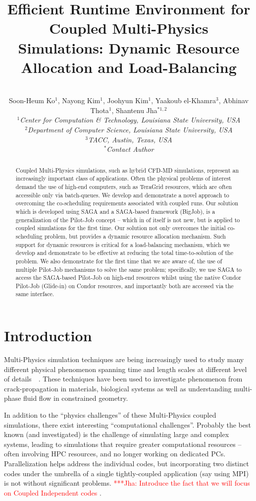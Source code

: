 \documentclass[conference,final]{IEEEtran}
\title{Efficient Runtime Environment for Coupled Multi-Physics Simulations: Dynamic 
Resource Allocation and Load-Balancing}
\author{
~\\[-2em]
Soon-Heum Ko$^{1}$, Nayong Kim$^{1}$, Joohyun Kim$^{1}$, Yaakoub el-Khamra$^{3}$, 
Abhinav Thota$^{1}$, Shantenu Jha$^{*1,2}$\\
\small{\emph{$^{1}$Center for Computation \& Technology, Louisiana State University, 
USA}}\\
\small{\emph{$^{2}$Department of Computer Science, Louisiana State University, USA}}\\
\small{\emph{$^{3}$TACC, Austin, Texas, USA}}\\
\small{\emph{$^{*}$Contact Author}}\\
}
\newcommand{\jhanote}[1]{ {\textcolor{red} { ***Jha: #1 }}}
\newcommand{\jhanote}[1]{}
\begin{document}
\maketitle

\begin{abstract}
Coupled Multi-Physics simulations, such as hybrid CFD-MD simulations, represent an 
increasingly important class of applications. Often the physical problems of interest 
demand the use of high-end computers, such as TeraGrid resources, which are often 
accessible only via batch-queues. We develop and demonstrate a novel approach to 
overcoming the co-scheduling requirements associated with coupled runs. Our solution 
which is developed using SAGA and a SAGA-based framework (BigJob), is a generalization of 
the Pilot-Job concept -- which in of itself is not new, but is applied to coupled 
simulations for the first time. Our solution not only overcomes the initial 
co-scheduling problem, but provides a dynamic resource allocation mechanism. Such support 
for dynamic resources is critical for a load-balancing mechanism, which we develop and 
demonstrate to be effective at reducing the total time-to-solution of the problem. We 
also demonstrate for the first time that we are aware of, the use of multiple Pilot-Job 
mechanisms to solve the same problem; specifically, we use SAGA to access the SAGA-based 
Pilot-Job on high-end resources whilst using the native Condor Pilot-Job (Glide-in) on 
Condor resources, and importantly both are accessed via the same interface.
\end{abstract}


\section{Introduction}

Multi-Physics simulation techniques are being increasingly used to study many different 
physical phenomenon spanning time and length scales at different level of 
details~\cite{Tai}~\cite{Watanabe}. These techniques have been used to investigate 
phenomenon from crack-propagation in materials, biological systems as well as 
understanding multi-phase fluid flow in constrained geometry.

In addition to the ``physics challenges'' of these Multi-Physics coupled simulations, 
there exist interesting ``computational challenges''. Probably the best known (and 
investigated) is the challenge of simulating large and complex systems, leading to 
simulations that require greater computational resources -- often involving HPC 
resources, and no longer working on dedicated PCs. Parallelization helps address the 
individual codes, but incorporating two distinct codes under the umbrella of a single 
tightly-coupled application (say using MPI) is not without significant problems. 
\jhanote{Introduce the fact that we will focus on Coupled Independent codes}.
\end{document}
